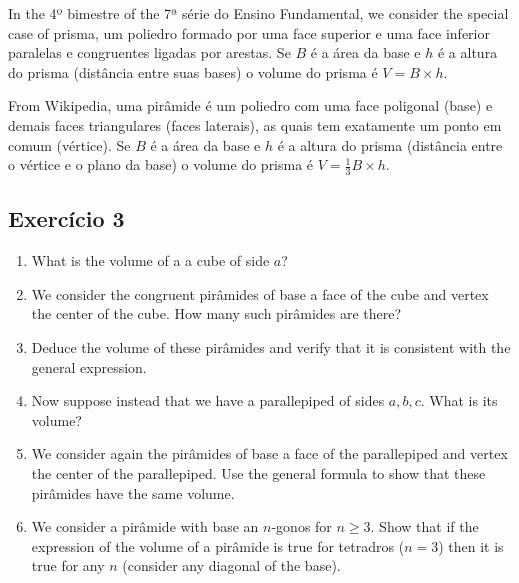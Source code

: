 In the 4º bimestre of the 7ª série do Ensino Fundamental, we consider the
special case of prisma, um poliedro formado por uma face superior e uma face
inferior paralelas e congruentes ligadas por arestas.
Se $B$ é a área da base e $h$ é a altura do prisma (distância entre suas bases)
o volume do prisma é $V = B \times h$.

\begin{center}
\end{center}

From Wikipedia, uma pirâmide é um poliedro com uma face poligonal (base) e
demais faces triangulares (faces laterais), as quais tem exatamente um ponto em
comum (vértice).
Se $B$ é a área da base e $h$ é a altura do prisma (distância entre o
vértice e o plano da base) o volume do prisma é $V = \frac{1}{3} B \times h$.

\begin{center}
\end{center}

\subsection*{Exercício 3}

\begin{enumerate}
\item What is the volume of a a cube of side $a$?
\item We consider the congruent pirâmides of base a face of the cube and vertex
  the center of the cube. How many such pirâmides are there?
\item Deduce the volume of these pirâmides and verify that it is consistent
  with the general expression.
\item Now suppose instead that we have a parallepiped of sides $a,b,c$.
  What is its volume?
\item We consider again the pirâmides of base a face of the parallepiped and
  vertex the center of the parallepiped. Use the general formula to show that
  these pirâmides have the same volume.
\item We consider a pirâmide with base an $n$-gonos for $n \geq 3$.
  Show that if the expression of the volume of a pirâmide is true for tetradros
  ($n=3$) then it is true for any $n$ (consider any diagonal of
  the base).
\end{enumerate}

